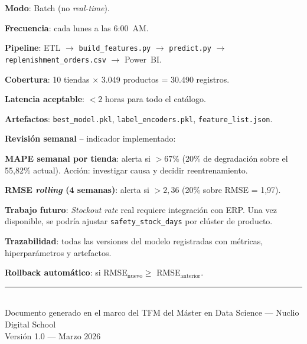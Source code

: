 \documentclass[12pt, a4paper, oneside]{report}
\newcommand{\code}[1]{\texttt{\small\color{codeblue}#1}}
\newcommand{\dataset}[1]{\texttt{\footnotesize\color{codepurple}#1}}
\begin{document}
\vspace{0.4cm}

\noindent
\begin{minipage}[t]{0.485\textwidth}
\begin{tcolorbox}[canvasbox, title={9.\ Making Predictions}]
\textbf{Modo}: Batch (no \textit{real-time}).

\medskip
\textbf{Frecuencia}: cada lunes a las 6:00~AM.

\medskip
\textbf{Pipeline}: ETL $\rightarrow$ \code{build\_features.py} $\rightarrow$ \code{predict.py} $\rightarrow$ \dataset{replenishment\_orders.csv} $\rightarrow$ Power~BI.

\medskip
\textbf{Cobertura}: 10 tiendas $\times$ 3.049 productos = 30.490 registros.

\medskip
\textbf{Latencia aceptable}: $< 2$ horas para todo el cat\'alogo.

\medskip
\textbf{Artefactos}: \code{best\_model.pkl}, \code{label\_encoders.pkl}, \code{feature\_list.json}.
\end{tcolorbox}
\end{minipage}
\hfill
\begin{minipage}[t]{0.485\textwidth}
\begin{tcolorbox}[canvasbox, title={10.\ Monitoring}]
\textbf{Revisi\'on semanal} -- indicador implementado:

\medskip
\textbf{MAPE semanal por tienda}: alerta si $> 67\%$ (20\% de degradaci\'on sobre el 55,82\% actual). Acci\'on: investigar causa y decidir reentrenamiento.

\medskip
\textbf{RMSE \textit{rolling} (4 semanas)}: alerta si $> 2{,}36$ (20\% sobre RMSE = 1,97).

\medskip
\textbf{Trabajo futuro}: \textit{Stockout rate} real requiere integraci\'on con ERP. Una vez disponible, se podr\'ia ajustar \code{safety\_stock\_days} por cl\'uster de producto.

\medskip
\textbf{Trazabilidad}: todas las versiones del modelo registradas con m\'etricas, hiperpar\'ametros y artefactos.

\medskip
\textbf{Rollback autom\'atico}: si RMSE$_{\text{nuevo}} \geq$ RMSE$_{\text{anterior}}$.
\end{tcolorbox}
\end{minipage}

\vfill
\begin{center}
  \small\color{nucliogray}
  \rule{0.6\textwidth}{0.4pt}\\[4pt]
  Documento generado en el marco del TFM del M\'aster en Data Science --- Nuclio Digital School\\
  Versi\'on 1.0 --- Marzo 2026
\end{center}
\end{document}
